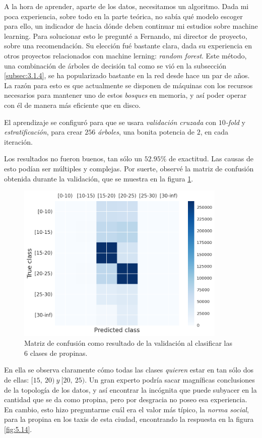 A la hora de aprender, aparte de los datos, necesitamos un algoritmo. Dada mi poca experiencia, sobre todo en la parte teórica, no sabía qué modelo escoger para ello, un indicador de hacia dónde deben continuar mi estudios sobre machine learning. Para solucionar esto le pregunté a Fernando, mi director de proyecto, sobre una recomendación. Su elección fué bastante clara, dada su experiencia en otros proyectos relacionados con machine lerning: \emph{random forest}. Este método, una combinación de árboles de decisión tal como se vió en la subsección \ref{subsec:3.1.4}, se ha popularizado bastante en la red desde hace un par de años. La razón para esto es que actualmente se disponen de máquinas con los recursos necesarios para mantener uno de estos \emph{bosques} en memoria, y así poder operar con él de manera más eficiente que en disco.

El aprendizaje se configuró para que se usara \emph{validación cruzada} con \emph{$10$-fold} y \emph{estratificación}, para crear \emph{$256$ árboles}, una bonita potencia de $2$, en cada iteración.

Los resultados no fueron buenos, tan sólo un $52.95\%$ de exactitud. Las causas de esto podían ser múltiples y complejas. Por suerte, observé la matriz de confusión obtenida durante la validación, que se muestra en la figura \ref{fig:5.13}.

\begin{figure}[H]
  \centering
  \includegraphics[width=100mm]{figures/ch_05/confusion_matrix_1.png}
  \caption{Matriz de confusión como resultado de la validación al clasificar las 6 clases de propinas.}
  \label{fig:5.13}
\end{figure}

En ella se observa claramente cómo todas las clases \emph{quieren} estar en tan sólo dos de ellas: $[15,\:20)\:y\:[20,\:25)$. Un gran experto podría sacar magníficas conclusiones de la topología de los datos, y así encontrar la incógnita que puede subyacer en la cantidad que se da como propina, pero por desgracia no poseo esa experiencia. En cambio, esto hizo preguntarme cuál era el valor más típico, la \emph{norma social}, para la propina en los taxis de esta ciudad, encontrando la respuesta en la figura \ref{fig:5.14}.

